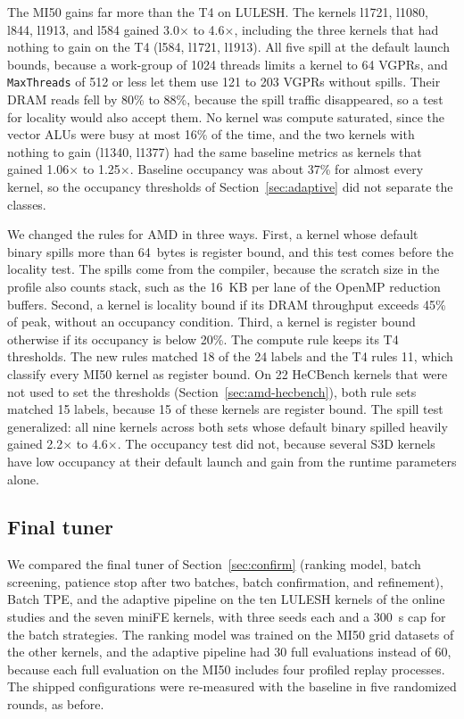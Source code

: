 \documentclass[10pt]{article}
\newcommand{\x}{\ensuremath{\times}}
\newcommand{\code}[1]{\texttt{#1}}
\begin{document}
The MI50 gains far more than the T4 on LULESH. The kernels l1721, l1080, l844,
l1913, and l584 gained 3.0\x{} to 4.6\x{}, including the three kernels that had
nothing to gain on the T4 (l584, l1721, l1913). All five spill at the default
launch bounds, because a work-group of 1024 threads limits a kernel to 64
VGPRs, and \code{MaxThreads} of 512 or less let them use 121 to 203 VGPRs
without spills. Their DRAM reads fell by 80\% to 88\%, because the spill traffic
disappeared, so a test for locality would also accept them. No kernel was
compute saturated, since the vector ALUs were busy at most 16\% of the time,
and the two kernels with nothing to gain (l1340, l1377) had the same baseline
metrics as kernels that gained 1.06\x{} to 1.25\x{}. Baseline occupancy was
about 37\% for almost every kernel, so the occupancy thresholds of
Section~\ref{sec:adaptive} did not separate the classes.

We changed the rules for AMD in three ways. First, a kernel whose default
binary spills more than 64~bytes is register bound, and this test comes before
the locality test. The spills come from the compiler, because the scratch size
in the profile also counts stack, such as the 16~KB per lane of the OpenMP
reduction buffers. Second, a kernel is locality bound if its DRAM throughput
exceeds 45\% of peak, without an occupancy condition. Third, a kernel is
register bound otherwise if its occupancy is below 20\%. The compute rule keeps
its T4 thresholds. The new rules matched 18 of the 24 labels and the T4 rules
11, which classify every MI50 kernel as register bound. On 22 HeCBench kernels
that were not used to set the thresholds (Section~\ref{sec:amd-hecbench}), both
rule sets matched 15 labels, because 15 of these kernels are register bound.
The spill test generalized: all nine kernels across both sets whose default
binary spilled heavily gained 2.2\x{} to 4.6\x{}. The occupancy test did not,
because several S3D kernels have low occupancy at their default launch and gain
from the runtime parameters alone.

\subsection{Final tuner}
\label{sec:amd-tuner}
We compared the final tuner of Section~\ref{sec:confirm} (ranking model,
batch screening, patience stop after two batches, batch confirmation, and
refinement), Batch TPE, and the adaptive pipeline on the ten LULESH kernels of
the online studies and the seven miniFE kernels, with three seeds each and a
300~s cap for the batch strategies. The ranking model was trained on the MI50
grid datasets of the other kernels, and the adaptive pipeline had 30 full
evaluations instead of 60, because each full evaluation on the MI50 includes
four profiled replay processes. The shipped configurations were re-measured with
the baseline in five randomized rounds, as before.
\end{document}
